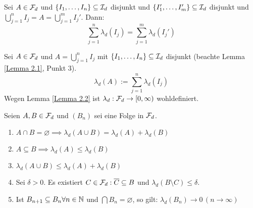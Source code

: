 \documentclass[a4paper,twoside,DIV15,BCOR12mm,chapterprefix=true,headings=onelinechapter]{scrbook}
\begin{document}
\begin{lemma}
\label{Lemma 2.2}
Sei \(A\in\mathcal{F}_{d}\) und \(\{I_{1},\ldots,I_{n}\}\subseteq\mathcal{I}_{d}\) disjunkt und
\(\{I_{1}',\ldots,I_{m}'\}\subseteq\mathcal{I}_{d}\) disjunkt und 
\(\bigcup_{j=1}^{n}{I_{j}}=A=\bigcup_{j=1}^{m}{I_{j}'}\). Dann:
\[
\sum_{j=1}^{n}{\lambda_{d}(I_{j})}=\sum_{j=1}^{m}{\lambda_{d}(I_{j}')}
\]
\end{lemma}
\begin{definition}
Sei \(A\in\mathcal{F}_{d}\) und \(A=\bigcup_{j=1}^{n}{I_{j}}\) mit \(\{I_{1},\ldots,I_{n}\}\subseteq\mathcal{I}_{d}\)
disjunkt (beachte Lemma \ref{Lemma 2.1}, Punkt 3).
\[
\lambda_{d}(A):=\sum_{j=1}^{n}{\lambda_{d}(I_{j})}
\]
Wegen Lemma \ref{Lemma 2.2} ist \(\lambda_{d}:\mathcal{F}_{d}\to[0,\infty)\)
wohldefiniert.
\end{definition}
\begin{satz}
\label{Satz 2.3}
Seien \(A,B\in\mathcal{F}_{d}\) und \((B_{n})\) sei eine Folge in \(\mathcal{F}_{d}\).
\begin{enumerate}
\item \(A\cap B=\varnothing\implies\lambda_{d}(A\cup B)=\lambda_{d}(A)+\lambda_{d}(B)\)
\item \(A\subseteq B\implies\lambda_{d}(A)\leq\lambda_{d}(B)\)
\item \(\lambda_{d}(A\cup B)\leq\lambda_{d}(A)+\lambda_{d}(B)\)
\item Sei \(\delta>0\). Es existiert \(C\in\mathcal{F}_{d}:\overline{C}\subseteq B\) und
\(\lambda_{d}(B\setminus C)\leq\delta\).
\item Ist \(B_{n+1}\subseteq B_{n}\forall n\in\mathbb{N}\) und \(\bigcap B_{n}=\varnothing\), so gilt: \(\lambda_{d}(B_{n})\to 0\,(n\to \infty)\)
\end{enumerate}
\end{satz}
\end{document}
